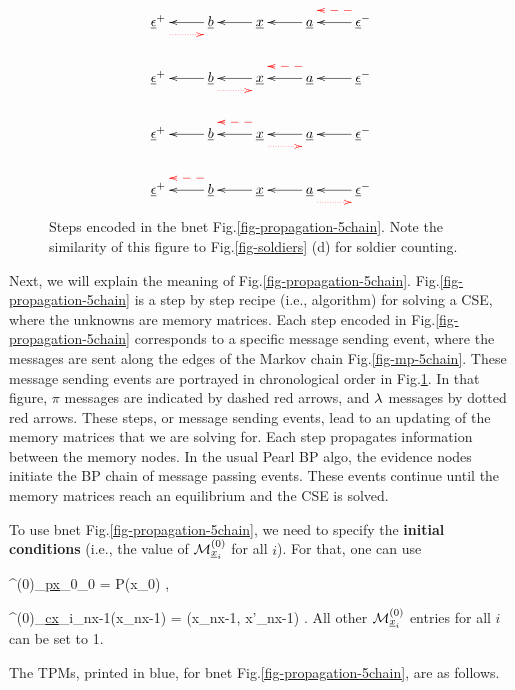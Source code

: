 \begin{figure}[h!]
$$
\xymatrix{
\rveps^+\ar@[red]@{.>}@<-2ex>[r]
&\rvb\ar[l]
&\rvx\ar[l]
&\rva\ar[l]
&\rveps^-\ar[l]\ar@[red]@{-->}@<-2ex>[l]
\\
\rveps^+
&\rvb\ar[l]\ar@[red]@{.>}@<-2ex>[r]
&\rvx\ar[l]
&\rva\ar[l]\ar@[red]@{-->}@<-2ex>[l]
&\rveps^-\ar[l]
\\
\rveps^+
&\rvb\ar[l]
&\rvx\ar[l]\ar@[red]@{.>}@<-2ex>[r]
\ar@[red]@{-->}@<-2ex>[l]
&\rva\ar[l]
&\rveps^-\ar[l]
\\
\rveps^+
&\rvb\ar[l]\ar@[red]@{-->}@<-2ex>[l]
&\rvx\ar[l]
&\rva\ar[l]\ar@[red]@{.>}@<-2ex>[r]
&\rveps^-\ar[l]
}$$
\caption{
Steps encoded in the 
bnet 
Fig.\ref{fig-propagation-5chain}.
Note the 
similarity 
of this figure 
to Fig.\ref{fig-soldiers} (d)
for soldier counting.
} 
\label{fig-multiframe-5chain}
\end{figure}

Next, we will
explain the meaning
of Fig.\ref{fig-propagation-5chain}.
Fig.\ref{fig-propagation-5chain}
is a step by step
recipe (i.e., algorithm)
for solving a CSE,
where the unknowns are
memory matrices.
Each step
encoded in
Fig.\ref{fig-propagation-5chain}
corresponds to a
specific
message sending event,
where the messages
are sent
along the edges 
of the Markov chain
Fig.\ref{fig-mp-5chain}.
These message sending
events are portrayed in
chronological order
in Fig.\ref{fig-multiframe-5chain}.
In that figure,
$\pi$ messages
are indicated by
dashed red arrows,
and $\lambda$ messages
by dotted red arrows.  
These steps, or
message  sending events,
lead to an updating
of the memory matrices
that we are solving for.
Each step propagates information
between the memory nodes.
In the usual Pearl BP algo, 
the evidence nodes 
initiate the BP
chain of 
message passing events.
These events 
continue
until 
the 
memory 
matrices
reach an equilibrium
and the CSE is solved.


To use
bnet 
Fig.\ref{fig-propagation-5chain},
we need to specify
the {\bf initial conditions}
(i.e., the value of 
${\cal M}^{(0)}_{{\underline{x}}_i}$ 
for all $i$).
For that, one can use

\beq
\pi^{(0)}_{\ul{px}_0\ldart \rvx_0}
=
P(x_0)
\;,
\eeq

\beq
\lam^{(0)}_{\ul{cx}_i\rdart\rvx_{nx-1}}(x_{nx-1})
=
\delta(x_{nx-1}, x'_{nx-1})
\;.
\eeq
All other ${\cal M}^{(0)}_{{\underline{x}}_i}$ entries
for all $i$ can be set to 1.

The TPMs, printed in blue, for
bnet Fig.\ref{fig-propagation-5chain},
are as follows.

